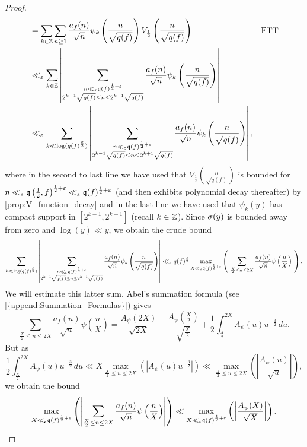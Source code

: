 \begin{proof}
\begin{align*}
        &= \sum_{k \in \mathbb{Z}}\sum_{n \ge 1}\frac{a_{f}(n)}{\sqrt{n}}\psi_{k}\left(\frac{n}{\sqrt{q(f)}}\right)V_{\frac{1}{2}}\left(\frac{n}{\sqrt{q(f)}}\right) && \text{FTT} \\
        &\ll_{\varepsilon} \sum_{k \in \mathbb{Z}}\left|\sum_{\substack{n \ll_{\varepsilon} \mathfrak{q}(f)^{\frac{1}{2}+\varepsilon} \\ 2^{k-1}\sqrt{q(f)} \le n \le 2^{k+1}\sqrt{q(f)}}}\frac{a_{f}(n)}{\sqrt{n}}\psi_{k}\left(\frac{n}{\sqrt{q(f)}}\right)\right| \\
        &\ll_{\varepsilon} \sum_{k \ll \log(q(f)^{\frac{\varepsilon}{2}})}\left|\sum_{\substack{n \ll_{\varepsilon} \mathfrak{q}(f)^{\frac{1}{2}+\varepsilon} \\ 2^{k-1}\sqrt{q(f)} \le n \le 2^{k+1}\sqrt{q(f)}}}\frac{a_{f}(n)}{\sqrt{n}}\psi_{k}\left(\frac{n}{\sqrt{q(f)}}\right)\right|,
      \end{align*}
      where in the second to last line we have used that $V_{\frac{1}{2}}\left(\frac{n}{\sqrt{q(f)}}\right)$ is bounded for $n \ll_{\varepsilon} \mathfrak{q}\left(\frac{1}{2},f\right)^{\frac{1}{2}+\varepsilon} \ll_{\varepsilon} \mathfrak{q}(f)^{\frac{1}{2}+\varepsilon}$ (and then exhibits polynomial decay thereafter) by \cref{prop:V_function_decay} and in the last line we have used that $\psi_{k}(y)$ has compact support in $[2^{k-1},2^{k+1}]$ (recall $k \in \mathbb{Z}$). Since $\sigma(y)$ is bounded away from zero and $\log(y) \ll y$, we obtain the crude bound
      \[
        \sum_{k \ll \log(q(f)^{\frac{\varepsilon}{2}})}\left|\sum_{\substack{n \ll_{\varepsilon} \mathfrak{q}(f)^{\frac{1}{2}+\varepsilon} \\ 2^{k-1}\sqrt{q(f)} \le n \le 2^{k+1}\sqrt{q(f)}}}\frac{a_{f}(n)}{\sqrt{n}}\psi_{k}\left(\frac{n}{\sqrt{q(f)}}\right)\right| \ll_{\varepsilon} q(f)^{\frac{\varepsilon}{2}}\max_{X \ll_{\varepsilon} \mathfrak{q}(f)^{\frac{1}{2}+\varepsilon}}\left(\left|\sum_{\frac{X}{2} \le n \le 2X}\frac{a_{f}(n)}{\sqrt{n}}\psi\left(\frac{n}{X}\right)\right|\right).
      \]
      We will estimate this latter sum. Abel's summation formula (see \cref{{append:Summation_Formulas}}) gives
      \[
        \sum_{\frac{X}{2} \le n \le 2X}\frac{a_{f}(n)}{\sqrt{n}}\psi\left(\frac{n}{X}\right) = \frac{A_{\psi}(2X)}{\sqrt{2X}}-\frac{A_{\psi}\left(\frac{X}{2}\right)}{\sqrt{\frac{X}{2}}}+\frac{1}{2}\int_{\frac{X}{2}}^{2X}A_{\psi}(u)u^{-\frac{3}{2}}\,du.
      \]
      But as
      \[
        \frac{1}{2}\int_{\frac{X}{2}}^{2X}A_{\psi}(u)u^{-\frac{3}{2}}\,du \ll X\max_{\frac{X}{2} \le u \le 2X}\left(\left|A_{\psi}(u)u^{-\frac{3}{2}}\right|\right) \ll \max_{\frac{X}{2} \le u \le 2X}\left(\left|\frac{A_{\psi}(u)}{\sqrt{u}}\right|\right),
      \]
      we obtain the bound
      \[
        \max_{X \ll_{\varepsilon} \mathfrak{q}(f)^{\frac{1}{2}+\varepsilon}}\left(\left|\sum_{\frac{X}{2} \le n \le 2X}\frac{a_{f}(n)}{\sqrt{n}}\psi\left(\frac{n}{X}\right)\right|\right) \ll \max_{X \ll_{\varepsilon} \mathfrak{q}(f)^{\frac{1}{2}+\varepsilon}}\left(\left|\frac{A_{\psi}(X)}{\sqrt{X}}\right|\right).
\]
\end{proof}
